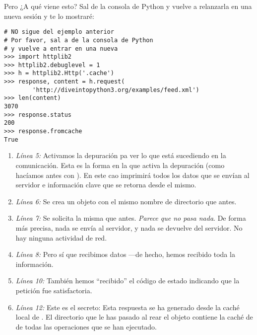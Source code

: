 Pero ¿A qué viene esto? Sal de la consola de Python y vuelve a relanzarla en una nueva sesión y te lo mostraré:

\noindent\begin{minipage}{\textwidth}
\begin{lstlisting}[mathescape=False]
# NO sigue del ejemplo anterior
# Por favor, sal a de la consola de Python
# y vuelve a entrar en una nueva
>>> import httplib2
>>> httplib2.debuglevel = 1
>>> h = httplib2.Http('.cache')
>>> response, content = h.request(
        'http://diveintopython3.org/examples/feed.xml')
>>> len(content)                        
3070
>>> response.status                    
200
>>> response.fromcache               
True
\end{lstlisting}
\end{minipage}

\begin{enumerate}

\item \emph{Línea 5:} Activamos la depuración pa ver lo que está sucediendo en la comunicación. Esta es la forma en la que  activa la depuración (como hacíamos antes con ). En este cao  imprimirá todos los datos que se envían al servidor e información clave que se retorna desde el mismo.

\item \emph{Línea 6:} Se crea un objeto  con el mismo nombre de directorio que antes.

\item \emph{Línea 7:} Se solicita la misma  que antes. \emph{Parece que no pasa nada}. De forma más precisa, nada se envía al servidor, y nada se devuelve del servidor. No hay ninguna actividad de red.

\item \emph{Línea 8:} Pero sí que recibimos datos ---de hecho, hemos recibido toda la información.

\item \emph{Línea 10:} También hemos ``recibido'' el código de estado   indicando que la petición fue satisfactoria.

\item \emph{Línea 12:} Este es el secreto: Esta respuesta se ha generado desde la caché local de . El directorio que le has pasado al rear el objeto  contiene la caché de  de todas las operaciones que se han ejecutado.

\end{enumerate}


